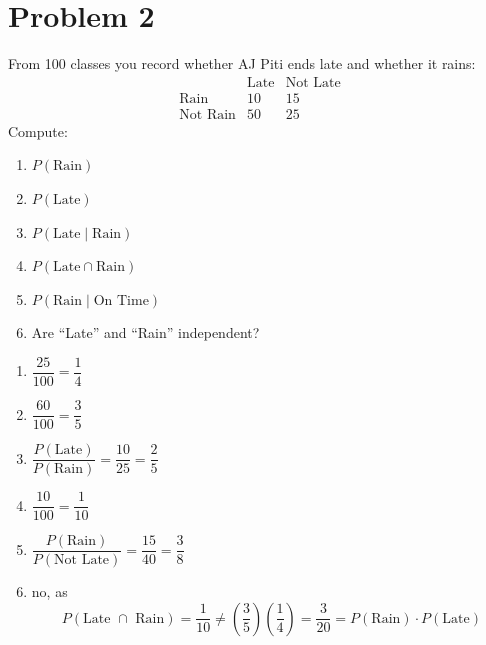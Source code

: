 \vspace{1em}
\hrulefill

\section*{Problem 2}
From 100 classes you record whether AJ Piti ends late and whether it rains:
\[
\begin{array}{c|cc}
& \text{Late} & \text{Not Late} \\
\hline
\text{Rain} & 10 & 15 \\
\text{Not Rain} & 50 & 25
\end{array}
\]
Compute:
\begin{enumerate}[label=\arabic*.]
    \item $P(\text{Rain})$
    \item $P(\text{Late})$
    \item $P(\text{Late} \mid \text{Rain})$
    \item $P(\text{Late} \cap \text{Rain})$
    \item $P(\text{Rain} \mid \text{On Time})$
    \item Are ``Late'' and ``Rain'' independent?
\end{enumerate}

\medskip
\solution

\begin{enumerate}
    \item $\dfrac{25}{100} = \dfrac{1}{4}$
    \item $\dfrac{60}{100} = \dfrac{3}{5}$
    \item $\dfrac{P(\text{Late})}{P(\text{Rain})} = \dfrac{10}{25} = \dfrac{2}{5}$
    \item $\dfrac{10}{100} = \dfrac{1}{10}$
    \item $\dfrac{P(\text{Rain})}{P(\text{Not Late})} = \dfrac{15}{40} = \dfrac{3}{8}$
    \item no, as \[P(\text{Late $\cap$ Rain}) = \dfrac{1}{10} \ne \left(\dfrac{3}{5}\right)\left(\dfrac{1}{4}\right) = \dfrac{3}{20} = P(\text{Rain}) \cdot P(\text{Late})\]
\end{enumerate}

\vspace{1em}
\hrulefill

